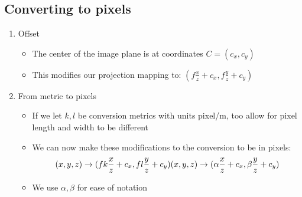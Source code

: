 \subsection{Converting to pixels}
\begin{enumerate}
	\item Offset
	\begin{itemize}
		\item The center of the image plane is at coordinates $C=(c_x, c_y)$
		\item This modifies our projection mapping to: $(f\frac{x}{z}+c_x, f\frac{y}{z}+c_y)$
	\end{itemize}
	\item From metric to pixels
	\begin{itemize}
		\item If we let $k, l$ be conversion metrics with units pixel/m, too allow for pixel length and width to be different
		\item We can now make these modifications to the conversion to be in pixels:
		$$(x,y,z)\to(fk\frac{x}{z}+c_x, fl\frac{y}{z}+c_y)\\
		(x,y,z)\to(\alpha \frac{x}{z}+c_x, \beta\frac{y}{z}+c_y)$$
		\item We use $\alpha, \beta$ for ease of notation 
	\end{itemize}
\end{enumerate}

